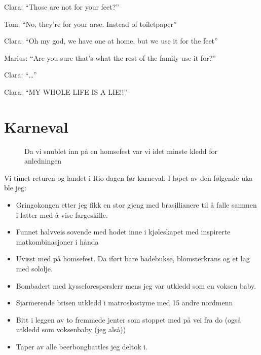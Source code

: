 \begin{dialogue}
	\item Clara: ``Those are not for your feet?''
	\item Tom: ``No, they're for your arse. Instead of
		toiletpaper''
	\item Clara: ``Oh my god, we have one at home, but we use it
		for the feet''
	\item Marius: ``Are you sure that's what the rest of the
		family use it for?''
	\item Clara: ``\ldots''
	\item Clara: ``MY WHOLE LIFE IS A LIE!!''
\end{dialogue}



\section*{Karneval}

\begin{figure}[H]
	\centering

\noindent{}
	\caption{Da vi snublet inn på en homsefest var vi idet minste
	kledd for anledningen}
	\label{fig:homsebloko}
\end{figure}


Vi timet returen og landet i Rio dagen før karneval. I løpet av den
følgende uka ble jeg:

\begin{itemize}
	\item  Gringokongen  etter jeg fikk  en stor gjeng med brasillianere til å falle
		sammen i latter med å vise fargeskille.
	\item Funnet halvveis sovende med hodet inne i kjøleskapet med
		inspirerte matkombinasjoner i hånda
	\item   Uvisst med på homsefest. Da iført bare badebukse, blomsterkrans og et lag med sololje.
	\item Bombadert med kysseforespørslerr mens jeg var utkledd
		som en voksen baby.
	\item Sjarmerende brisen utkledd i matroskostyme med 15 andre
		nordmenn
	\item  Bitt i leggen av to fremmede jenter som stoppet
		med på vei fra do (også utkledd som voksenbaby (jeg
		alså))
	\item Taper av alle beerbongbattles jeg deltok i.
	
\end{itemize}

